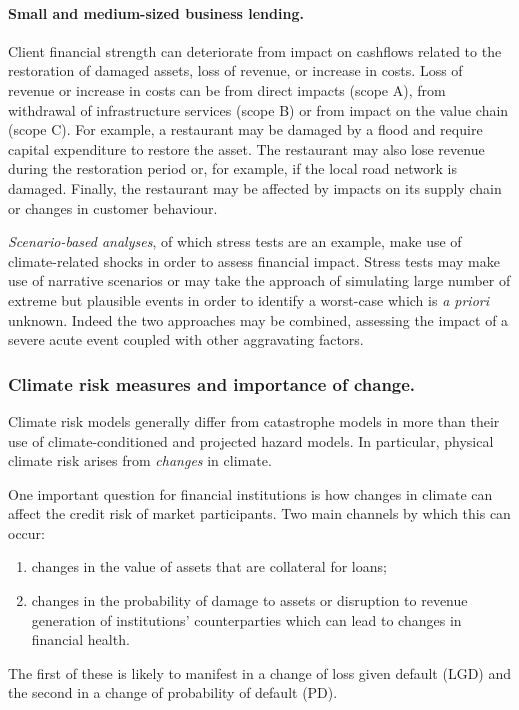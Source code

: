 \documentclass[a4paper,11pt]{extarticle} %
\theoremstyle{definition}
\begin{document}
\paragraph{Small and medium-sized business lending.} Client financial strength can deteriorate from impact on cashflows related to the restoration of damaged assets, loss of revenue, or increase in costs. Loss of revenue or increase in costs can be from direct impacts (scope A), from withdrawal of infrastructure services (scope B) or from impact on the value chain (scope C). For example, a restaurant may be damaged by a flood and require capital expenditure to restore the asset. The restaurant may also lose revenue during the restoration period or, for example, if the local road network is damaged. Finally, the restaurant may be affected by impacts on its supply chain or changes in customer behaviour.

\emph{Scenario-based analyses}, of which stress tests are an example, make use of climate-related shocks in order to assess financial impact. Stress tests may make use of narrative scenarios or may take the approach of simulating large number of extreme but plausible events in order to identify a worst-case which is \emph{a priori} unknown. Indeed the two approaches may be combined, assessing the impact of a severe acute event coupled with other aggravating factors.


\subsubsection{Climate risk measures and importance of change.}
Climate risk models generally differ from catastrophe models in more than their use of climate-conditioned and projected hazard models. In particular, physical climate risk arises from \emph{changes} in climate.

One important question for financial institutions is how changes in climate can affect the credit risk of market participants. Two main channels by which this can occur:
\begin{enumerate}
    \item changes in the value of assets that are collateral for loans;
    \item changes in the probability of damage to assets or disruption to revenue generation of institutions' counterparties which can lead to changes in financial health.
\end{enumerate}

The first of these is likely to manifest in a change of loss given default (LGD) and the second in a change of probability of default (PD).
\end{document}
